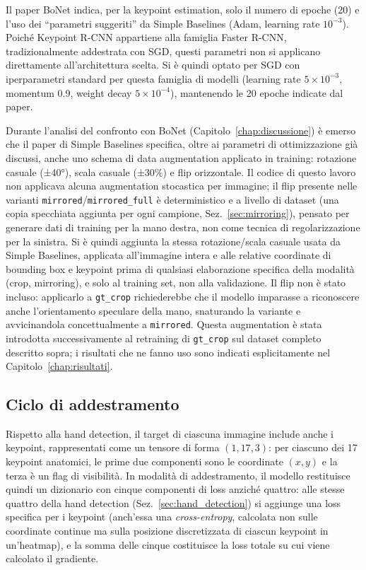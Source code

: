 Il paper BoNet indica, per la keypoint estimation, solo il numero di
epoche (20) e l'uso dei ``parametri suggeriti'' da Simple Baselines
(Adam, learning rate $10^{-3}$). Poiché Keypoint R-CNN appartiene alla
famiglia Faster R-CNN, tradizionalmente addestrata con SGD, questi
parametri non si applicano direttamente all'architettura scelta. Si è
quindi optato per SGD con iperparametri standard per questa famiglia di
modelli (learning rate $5\times10^{-3}$, momentum 0.9, weight decay
$5\times10^{-4}$), mantenendo le 20 epoche indicate dal paper.

Durante l'analisi del confronto con BoNet (Capitolo~\ref{chap:discussione})
è emerso che il paper di Simple Baselines specifica, oltre ai parametri
di ottimizzazione già discussi, anche uno schema di data augmentation
applicato in training: rotazione casuale (±40°), scala casuale (±30\%) e
flip orizzontale. Il codice di questo lavoro non applicava alcuna
augmentation stocastica per immagine; il flip presente nelle varianti
\texttt{mirrored}/\texttt{mirrored\_full} è deterministico e a livello
di dataset (una copia specchiata aggiunta per ogni campione,
Sez.~\ref{sec:mirroring}), pensato per generare dati di training per la
mano destra, non come tecnica di regolarizzazione per la sinistra. Si è
quindi aggiunta la stessa rotazione/scala casuale usata da Simple
Baselines, applicata all'immagine intera e alle relative coordinate di
bounding box e keypoint prima di qualsiasi elaborazione specifica della
modalità (crop, mirroring), e solo al training set, non alla
validazione. Il flip non è stato incluso: applicarlo a \texttt{gt\_crop}
richiederebbe che il modello imparasse a riconoscere anche
l'orientamento speculare della mano, snaturando la variante e
avvicinandola concettualmente a \texttt{mirrored}. Questa augmentation è
stata introdotta successivamente al retraining di \texttt{gt\_crop} sul
dataset completo descritto sopra; i risultati che ne fanno uso sono
indicati esplicitamente nel Capitolo~\ref{chap:risultati}.

\subsection{Ciclo di addestramento}

Rispetto alla hand detection, il target di ciascuna immagine include
anche i keypoint, rappresentati come un tensore di forma $(1, 17, 3)$:
per ciascuno dei 17 keypoint anatomici, le prime due componenti sono le
coordinate $(x, y)$ e la terza è un flag di visibilità. In modalità di
addestramento, il modello restituisce quindi un dizionario con cinque
componenti di loss anziché quattro: alle stesse quattro della hand
detection (Sez.~\ref{sec:hand_detection}) si aggiunge una loss
specifica per i keypoint (anch'essa una \emph{cross-entropy}, calcolata
non sulle coordinate continue ma sulla posizione discretizzata di
ciascun keypoint in un'heatmap), e la somma delle cinque costituisce la
loss totale su cui viene calcolato il gradiente.


